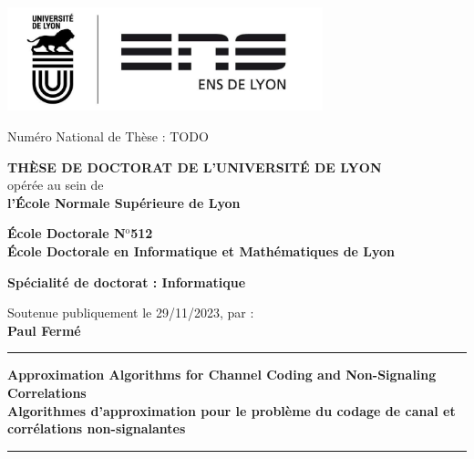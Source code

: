 \documentclass[11pt,a4paper]{book}
\begin{document}
\setlength{\parindent}{0pt}
\thispagestyle{empty}

\begin{center}
\includegraphics[height=3cm]{logo} %
\end{center}


\fontsize{11pt}{13pt}\selectfont
Numéro National de Thèse : TODO

\vspace{1cm}

\begin{center}
\fontsize{14pt}{16pt}\selectfont
\textbf{\uppercase{Thèse de doctorat de l'université de Lyon}}\\
\fontsize{12pt}{14pt}\selectfont
opérée au sein de\\
\textbf{l'École Normale Supérieure de Lyon}

\vspace{0.5cm}

\textbf{École Doctorale N$^{\mathrm{o}}$512\\%
École Doctorale en Informatique et Mathématiques de Lyon}%

\vspace{0.5cm}

\textbf{Spécialité de doctorat : Informatique\\
}


\vspace{1.5cm}

Soutenue publiquement le 29/11/2023, par :\\
\fontsize{14pt}{16pt}\selectfont
\textbf{Paul Fermé}

\vspace{1.5cm} %

\rule[20pt]{\textwidth}{0.5pt}

\fontsize{25pt}{28pt}\selectfont
\textbf{Approximation Algorithms for Channel Coding and Non-Signaling Correlations}\\[.5em]
\fontsize{18pt}{21pt}\selectfont
\textbf{Algorithmes d'approximation pour le problème du codage de canal et corrélations non-signalantes}

\rule{\textwidth}{0.5pt}

\vspace{1cm} %
\end{center}
\end{document}
